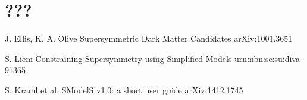 \chapter{???}
        \loremipsum



        \loremipsum



\begin{thebibliography}{2}
   
             {J. Ellis, K. A. Olive}
             {Supersymmetric Dark Matter Candidates}
             {arXiv:1001.3651}

             {S. Liem}
             {Constraining Supersymmetry using Simplified Models}
             {urn:nbn:se:su:diva-91365}

             {S. Kraml et al.}
             {SModelS v1.0: a short user guide}
             {arXiv:1412.1745}

%
%

\end{thebibliography}



